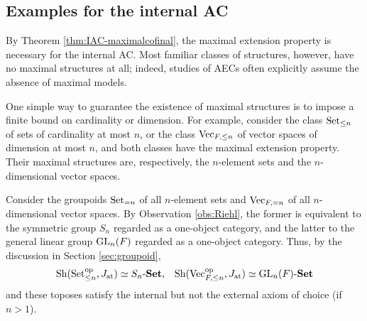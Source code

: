 \documentclass[10pt]{amsart}
\numberwithin{equation}{section}
\theoremstyle{plain}
\theoremstyle{definition}
\newcommand{\K}{\mathcal{K}}
\begin{document}
%
%
%


\subsection{Examples for the internal AC}\label{exa:IAC}

By Theorem \ref{thm:IAC-maximalcofinal}, the maximal extension property is necessary for the internal AC.
Most familiar classes of structures, however, have no maximal structures at all; indeed, studies of AECs often explicitly assume the absence of maximal models.

One simple way to guarantee the existence of maximal structures is to impose a finite bound on cardinality or dimension.
For example, consider the class ${\rm Set}_{\leq n}$ of sets of cardinality at most $n$, or the class ${\rm Vec}_{F,\leq n}$ of vector spaces of dimension at most $n$, and both classes have the maximal extension property.
Their maximal structures are, respectively, the $n$-element sets and the $n$-dimensional vector spaces.
%

Consider the groupoids ${\rm Set}_{=n}$ of all $n$-element sets and ${\rm Vec}_{F,=n}$ of all $n$-dimensional vector spaces. By Observation \ref{obs:Riehl}, the former is equivalent to the symmetric group $S_n$ regarded as a one-object category, and the latter to the general linear group ${\rm GL}_n(F)$ regarded as a one-object category.
Thus, by the discussion in Section \ref{sec:groupoid},
\begin{align*}
{\rm Sh}({\rm Set}_{\leq n}^{\rm op},J_{\rm at})\simeq S_n\text{-}{\bf Set},
& &
{\rm Sh}({\rm Vec}_{F,\leq n}^{\rm op},J_{\rm at})\simeq {\rm GL}_n(F)\text{-}{\bf Set}
\end{align*}
and these toposes satisfy the internal but not the external axiom of choice (if $n>1$).
\end{document}
